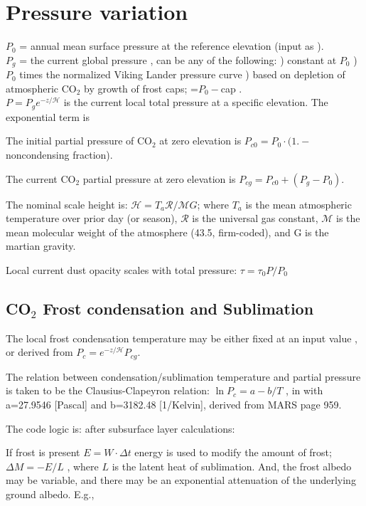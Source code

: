 \documentclass{article}
\def\qH{\mathcal{H}} %
\begin{document}
\section{Pressure variation}
$P_0$ = annual mean surface pressure at the reference elevation (input as
 ). 
\\$P_g$ = the current global pressure , can be any of the following: 
) constant at $P_0$
) $P_0$ times the normalized Viking Lander pressure curve 
) based on depletion of atmospheric CO$_2$ by growth of frost caps; =$P_0-$cap .
\\$P=P_g e^{-z/\qH}$  is the current local total pressure at a specific elevation. The exponential term is  

The initial partial pressure of CO$_2$ at zero
elevation is $P_{c0} = P_0 \cdot (1.- $noncondensing fraction). 

The current CO$_2$ partial pressure at zero elevation is $P_{cg}=P_{c0} +
(P_g-P_0)$.  

The nominal scale height is: $\qH=T_a \mathcal{R} / \mathcal{M} G $;
where $T_a$ is the mean atmospheric temperature over
prior day (or season), $\mathcal{R}$ is the
universal gas constant, $\mathcal{M}$ is the mean molecular weight of
the atmosphere (43.5, firm-coded), and G is the martian gravity.

Local current dust opacity scales with total pressure: $ \tau = \tau_0 P/P_0$

\subsection {CO$_2$ Frost condensation and Sublimation \label{sec:frost}}

The local frost condensation temperature  may be either fixed at an
input value , or derived from $P_c= e^{-z/\qH} P_{cg}$.

The relation between condensation/sublimation temperature and partial pressure
is taken to be the Clausius-Clapeyron relation: $ \ln P_c=a-b/T$ , in
 with a=27.9546 [Pascal] and b=3182.48 [1/Kelvin], derived from
MARS page 959.

The code logic is: after subsurface layer calculations:

If frost is present $E=W \cdot \Delta t$ energy is used to modify the amount of
frost; $\Delta M = -E/L$ , where $L$ is the latent heat of sublimation. And, the
frost albedo may be variable, and there may be an exponential attenuation of the
underlying ground albedo. E.g.,
\end{document}
